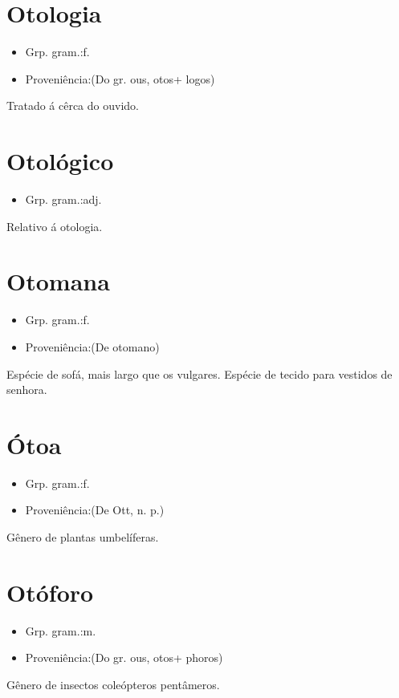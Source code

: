 \section{Otologia}
\begin{itemize}
\item {Grp. gram.:f.}
\end{itemize}
\begin{itemize}
\item {Proveniência:(Do gr. \textunderscore ous\textunderscore , \textunderscore otos\textunderscore  + \textunderscore logos\textunderscore )}
\end{itemize}
Tratado á cêrca do ouvido.
\section{Otológico}
\begin{itemize}
\item {Grp. gram.:adj.}
\end{itemize}
Relativo á otologia.
\section{Otomana}
\begin{itemize}
\item {Grp. gram.:f.}
\end{itemize}
\begin{itemize}
\item {Proveniência:(De \textunderscore otomano\textunderscore )}
\end{itemize}
Espécie de sofá, mais largo que os vulgares.
Espécie de tecido para vestidos de senhora.
\section{Ótoa}
\begin{itemize}
\item {Grp. gram.:f.}
\end{itemize}
\begin{itemize}
\item {Proveniência:(De \textunderscore Ott\textunderscore , n. p.)}
\end{itemize}
Gênero de plantas umbelíferas.
\section{Otóforo}
\begin{itemize}
\item {Grp. gram.:m.}
\end{itemize}
\begin{itemize}
\item {Proveniência:(Do gr. \textunderscore ous\textunderscore , \textunderscore otos\textunderscore  + \textunderscore phoros\textunderscore )}
\end{itemize}
Gênero de insectos coleópteros pentâmeros.
